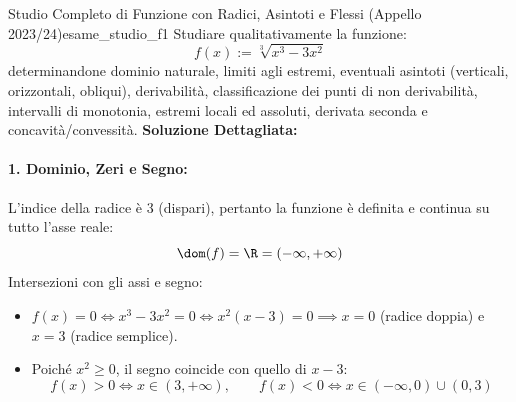 \begin{esempio}{Studio Completo di Funzione con Radici, Asintoti e Flessi (Appello 2023/24)}{esame_studio_f1}
Studiare qualitativamente la funzione:
\[
    f(x) := \sqrt[3]{x^3 - 3x^2}
\]
determinandone dominio naturale, limiti agli estremi, eventuali asintoti (verticali, orizzontali, obliqui), derivabilità, classificazione dei punti di non derivabilità, intervalli di monotonia, estremi locali ed assoluti, derivata seconda e concavità/convessità.
\tcblower
\textbf{Soluzione Dettagliata:}

\paragraph{1. Dominio, Zeri e Segno:}
L'indice della radice è $3$ (dispari), pertanto la funzione è definita e continua su tutto l'asse reale:
\[
    \dom(f) = \R = (-\infty, +\infty)
\]
Intersezioni con gli assi e segno:
\begin{itemize}
    \item $f(x) = 0 \iff x^3 - 3x^2 = 0 \iff x^2(x - 3) = 0 \implies x = 0$ (radice doppia) e $x = 3$ (radice semplice).
    \item Poiché $x^2 \ge 0$, il segno coincide con quello di $x - 3$:
    \[
        f(x) > 0 \iff x \in (3, +\infty), \qquad f(x) < 0 \iff x \in (-\infty, 0) \cup (0, 3)
    \]
\end{itemize}


\end{esempio}

